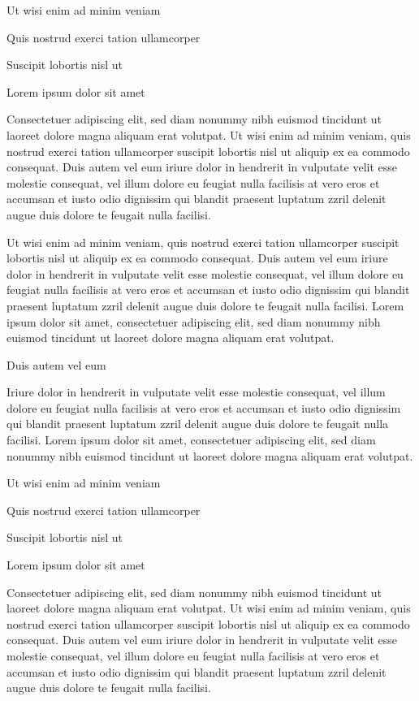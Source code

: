 \documentclass[11pt,twoside]{article}\makeatletter
\begin{document}
Ut wisi enim ad minim veniam\par
Quis nostrud exerci tation ullamcorper \par
Suscipit lobortis nisl ut \par
Lorem ipsum dolor sit amet\par
Consectetuer adipiscing elit, sed diam nonummy nibh euismod       tincidunt ut laoreet dolore magna aliquam erat volutpat. Ut wisi enim       ad minim veniam, quis nostrud exerci tation ullamcorper suscipit       lobortis nisl ut aliquip ex ea commodo consequat. Duis autem vel eum       iriure dolor in hendrerit in vulputate velit esse molestie consequat,       vel illum dolore eu feugiat nulla facilisis at vero eros et accumsan       et iusto odio dignissim qui blandit praesent luptatum zzril delenit       augue duis dolore te feugait nulla facilisi.\par
Ut wisi enim ad minim veniam, quis nostrud exerci tation       ullamcorper suscipit lobortis nisl ut aliquip ex ea commodo       consequat. Duis autem vel eum iriure dolor in hendrerit in vulputate       velit esse molestie consequat, vel illum dolore eu feugiat nulla       facilisis at vero eros et accumsan et iusto odio dignissim qui blandit       praesent luptatum zzril delenit augue duis dolore te feugait nulla       facilisi. Lorem ipsum dolor sit amet, consectetuer adipiscing elit,       sed diam nonummy nibh euismod tincidunt ut laoreet dolore magna       aliquam erat volutpat. \par
Duis autem vel eum \par
Iriure dolor in hendrerit in vulputate velit esse molestie       consequat, vel illum dolore eu feugiat nulla facilisis at vero eros et       accumsan et iusto odio dignissim qui blandit praesent luptatum zzril       delenit augue duis dolore te feugait nulla facilisi. Lorem ipsum dolor       sit amet, consectetuer adipiscing elit, sed diam nonummy nibh euismod       tincidunt ut laoreet dolore magna aliquam erat volutpat. \par
Ut wisi enim ad minim veniam\par
Quis nostrud exerci tation ullamcorper \par
Suscipit lobortis nisl ut \par
Lorem ipsum dolor sit amet\par
Consectetuer adipiscing elit, sed diam nonummy nibh euismod       tincidunt ut laoreet dolore magna aliquam erat volutpat. Ut wisi enim       ad minim veniam, quis nostrud exerci tation ullamcorper suscipit       lobortis nisl ut aliquip ex ea commodo consequat. Duis autem vel eum       iriure dolor in hendrerit in vulputate velit esse molestie consequat,       vel illum dolore eu feugiat nulla facilisis at vero eros et accumsan       et iusto odio dignissim qui blandit praesent luptatum zzril delenit       augue duis dolore te feugait nulla facilisi.\par
\end{document}
